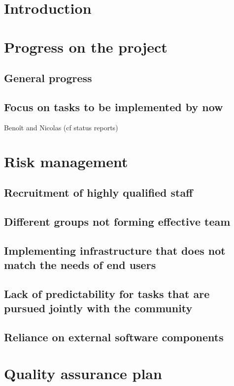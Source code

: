 \documentclass{../../Proposal/LaTeX-proposal/deliverablereport}
\author{Nicolas Thiéry & Benoît Pilorget}
\begin{document}
\maketitle
\newpage

\tableofcontents\newpage

\section{Introduction}

\section{Progress on the project}
\subsection{General progress}
\subsection{Focus on tasks to be implemented by now} 
Benoît and Nicolas (cf status reports)

\section{Risk management}
\subsection{Recruitment of highly qualified staff}
\subsection{Different groups not forming effective team}
\subsection{Implementing infrastructure that does not match the needs of end users}
\subsection{Lack of predictability for tasks that are pursued jointly with the community}
\subsection{Reliance on external software components}

\section{Quality assurance plan}
\end{document}
